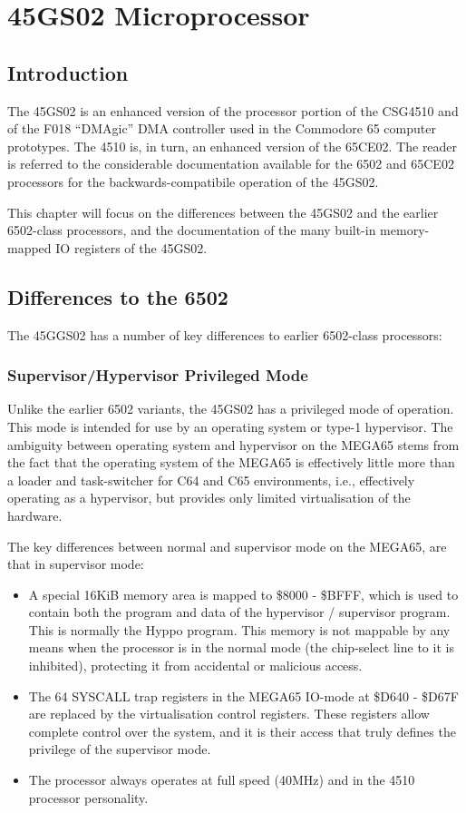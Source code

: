 \chapter{45GS02 Microprocessor}

\section{Introduction}

The 45GS02 is an enhanced version of the processor portion of the CSG4510
and of the F018 ``DMAgic'' DMA controller used in the Commodore 65 computer prototypes.  The 4510 is, in turn,
an enhanced version of the 65CE02.  
The reader is referred to
the considerable documentation available for the 6502 and 65CE02 processors
for the backwards-compatibile operation of the 45GS02.

This chapter will
focus on the differences between the 45GS02 and the earlier 6502-class
processors, and the documentation of the many built-in memory-mapped IO
registers of the 45GS02.

\section{Differences to the 6502}

The 45GGS02 has a number of key differences to earlier 6502-class processors:

\subsection{Supervisor/Hypervisor Privileged Mode}

Unlike the earlier 6502 variants, the 45GS02 has a privileged mode of operation.
This mode is intended for use by an operating system or type-1 hypervisor.  The ambiguity between
operating system and hypervisor on the MEGA65 stems from the fact that the operating
system of the MEGA65 is effectively little more than a loader and task-switcher for C64 and C65
environments, i.e., effectively operating as a hypervisor, but provides only limited virtualisation
of the hardware.

The key differences between normal and supervisor mode on the MEGA65, are that in
supervisor mode:

\begin{itemize}
\item A special 16KiB memory area is mapped to \$8000 - \$BFFF, which is used to contain both
  the program and data of the hypervisor / supervisor program.  This is normally the Hyppo program.
  This memory is not mappable by any means when the processor is in the normal mode (the chip-select
  line to it is inhibited), protecting it from accidental or malicious access.
\item The 64 SYSCALL trap registers in the MEGA65 IO-mode at \$D640 - \$D67F are replaced by the
  virtualisation control registers.  These registers allow complete control over the system, and
  it is their access that truly defines the privilege of the supervisor mode.
  \item The processor always operates at full speed (40MHz) and in the 4510 processor personality.
\end{itemize}

